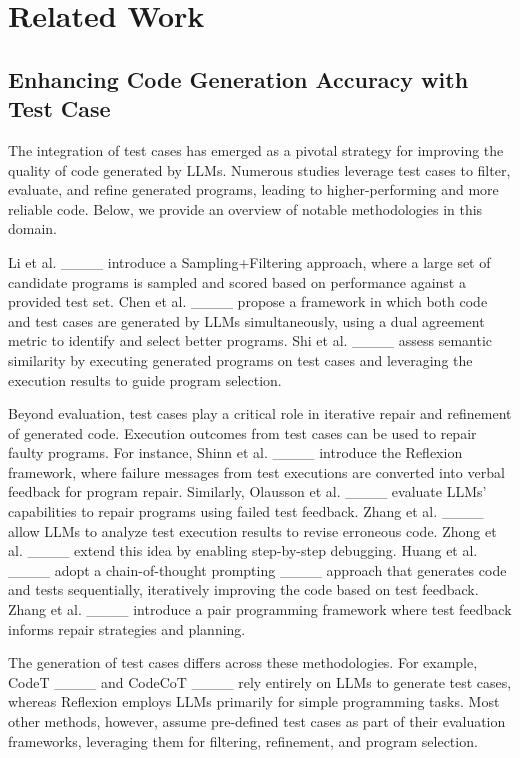 \section{Related Work}
\label{sec:related-work}
\subsection{Enhancing Code Generation Accuracy with Test Case}

The integration of test cases has emerged as a pivotal strategy for improving the quality of code generated by LLMs. 
Numerous studies leverage test cases to filter, evaluate, and refine generated programs, leading to higher-performing and more reliable code. 
Below, we provide an overview of notable methodologies in this domain.


Li et al. ____ introduce a Sampling+Filtering approach, 
where a large set of candidate programs is sampled and scored based on performance against a provided test set.
Chen et al. ____ propose a framework in which both code and test cases are generated by LLMs simultaneously, using a dual agreement metric to identify and select better programs. 
Shi et al. ____ assess semantic similarity by executing generated programs on test cases and leveraging the execution results to guide program selection.

Beyond evaluation, test cases play a critical role in iterative repair and refinement of generated code. 
Execution outcomes from test cases can be used to repair faulty programs. 
For instance, Shinn et al. ____ introduce the Reflexion framework, 
where failure messages from test executions are converted into verbal feedback for program repair. 
Similarly, Olausson et al. ____ evaluate LLMs' capabilities to repair programs using failed test feedback. 
Zhang et al. ____ allow LLMs to analyze test execution results to revise erroneous code.
Zhong et al. ____ extend this idea by enabling step-by-step debugging.
Huang et al. ____ adopt a chain-of-thought prompting ____ approach that generates code and tests sequentially, iteratively improving the code based on test feedback.
Zhang et al. ____ introduce a pair programming framework where test feedback informs repair strategies and planning.

The generation of test cases differs across these methodologies.
For example, CodeT ____ and CodeCoT ____ rely entirely on LLMs to generate test cases, 
whereas Reflexion employs LLMs primarily for simple programming tasks. 
Most other methods, however, assume pre-defined test cases as part of their evaluation frameworks, 
leveraging them for filtering, refinement, and program selection.



